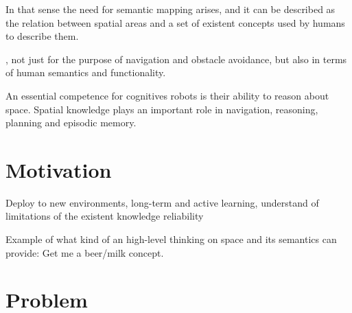 
In that sense the need for semantic mapping arises, and it can be described as the
relation between spatial areas and a set of existent concepts used by humans to
describe them.

, not just for the purpose of navigation and obstacle avoidance, 
but also in terms of human semantics and functionality.

An essential competence for cognitives robots is their ability to reason about space.
Spatial knowledge plays an important role in navigation, reasoning, planning and episodic memory.
%







\section{Motivation}

Deploy to new environments, long-term and active learning,
understand of limitations of the existent knowledge
reliability

Example of what kind of an high-level thinking on space and its semantics can
provide: Get me a beer/milk concept.


%
%
%
%

\section{Problem}


